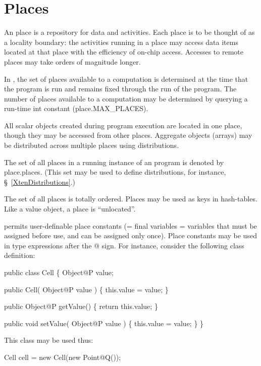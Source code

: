 \chapter{Places}
\label{XtenPlaces}

An \Xten{} place is a repository for data and activities. Each place is to
be thought of as a locality boundary: the activities running in a
place may access data items located at that place with the efficiency
of on-chip access. Accesses to remote places may take orders of
magnitude longer.

In \XtenCurrVer{}, the set of places available to a computation is
determined at the time that the program is run and remains fixed
through the run of the program. The number of places available to a
computation may be determined by querying a run-time int constant
({\cf place.MAX\_PLACES}).

All scalar objects created during program execution are located in one
place, though they may be accessed from other places. Aggregate
objects (arrays) may be distributed across multiple places using
distributions.

The set of all places in a running instance of an \Xten{} program is
denoted by {\cf place.places}. (This set may be used to define
distributions, for instance, \S~\ref{XtenDistributions}.)



The set of all places is totally ordered. Places may be used as keys
in hash-tables. Like a value object, a place is ``unlocated''.

\Xten{} permits user-definable place constants (= final variables =
variables that must be assigned before use, and can be assigned only
once). Place constants may be used in type expressions after the {\cf @}
sign. For instance, consider the following class definition:

\begin{x10}
 public class Cell \{
  Object@P value;

  public Cell( Object@P value ) \{  
     this.value = value;
  \}

  public Object@P getValue() \{
     return this.value;
  \}

  public void setValue( Object@P value ) \{
     this.value = value;
  \}
 \}
\end{x10}

This class may be used thus:

\begin{x10}
Cell cell = 
   new Cell(new Point@Q());
\end{x10}



